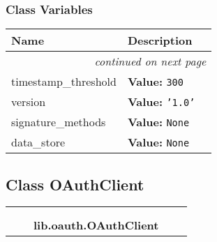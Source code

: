 
  \subsubsection{Class Variables}

    \vspace{-1cm}
\hspace{\varindent}\begin{longtable}{|p{\varnamewidth}|p{\vardescrwidth}|l}
\cline{1-2}
\cline{1-2} \centering \textbf{Name} & \centering \textbf{Description}& \\
\cline{1-2}
\endhead\cline{1-2}\multicolumn{3}{r}{\small\textit{continued on next page}}\\\endfoot\cline{1-2}
\endlastfoot\raggedright t\-i\-m\-e\-s\-t\-a\-m\-p\-\_\-t\-h\-r\-e\-s\-h\-o\-l\-d\- & \raggedright \textbf{Value:} 
{\tt 300}&\\
\cline{1-2}
\raggedright v\-e\-r\-s\-i\-o\-n\- & \raggedright \textbf{Value:} 
{\tt \texttt{'}\texttt{1.0}\texttt{'}}&\\
\cline{1-2}
\raggedright s\-i\-g\-n\-a\-t\-u\-r\-e\-\_\-m\-e\-t\-h\-o\-d\-s\- & \raggedright \textbf{Value:} 
{\tt None}&\\
\cline{1-2}
\raggedright d\-a\-t\-a\-\_\-s\-t\-o\-r\-e\- & \raggedright \textbf{Value:} 
{\tt None}&\\
\cline{1-2}
\end{longtable}



\subsection{Class OAuthClient}

    \label{lib:oauth:OAuthClient}
\begin{tabular}{cccccc}
\multicolumn{2}{r}{\settowidth{\BCL}{object}\multirow{2}{\BCL}{object}}
&&
  \\\cline{3-3}
  &&\multicolumn{1}{c|}{}
&&
  \\
&&\multicolumn{2}{l}{\textbf{lib.oauth.OAuthClient}}
\end{tabular}

